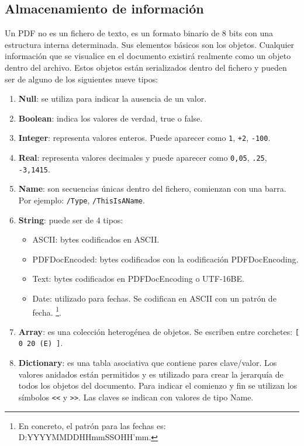 
\subsection{Almacenamiento de información}

Un PDF no es un fichero de texto, es un formato binario de 8 bits con una estructura interna determinada. Sus elementos básicos son los objetos. Cualquier información que se visualice en el documento existirá realmente como un objeto dentro del archivo. Estos objetos están serializados dentro del fichero y pueden ser de alguno de los siguientes nueve tipos:

\begin{enumerate}
    \item \textbf{Null}: se utiliza para indicar la ausencia de un valor.
    \item \textbf{Boolean}: indica los valores de verdad, true o false.
    \item \textbf{Integer}: representa valores enteros. Puede aparecer como \verb|1|, \verb|+2|, \verb|-100|.
    \item \textbf{Real}: representa valores decimales y puede aparecer como \verb|0,05|, \verb|.25|, \verb|-3,1415|.
    \item \textbf{Name}: son secuencias únicas dentro del fichero, comienzan con una barra. Por ejemplo: \verb|/Type|, \verb|/ThisIsAName|.
    \item \textbf{String}: puede ser de 4 tipos:
    \begin{itemize}
        \item ASCII: bytes codificados en ASCII.
        \item PDFDocEncoded: bytes codificados con la codificación PDFDocEncoding.
        \item Text: bytes codificados en PDFDocEncoding o UTF-16BE.
        \item Date: utilizado para fechas. Se codifican en ASCII con un patrón de fecha. \footnote{En concreto, el patrón para las fechas es: D:YYYYMMDDHHmmSSOHH’mm.}.
    \end{itemize}
    \item \textbf{Array}: es una colección heterogénea de objetos. Se escriben entre corchetes: \verb|[ 0 20 (E) ]|.
    \item \textbf{Dictionary}: es una tabla asociativa que contiene pares clave/valor. Los valores anidados están permitidos y es utilizado para crear la jerarquía de todos los objetos del documento. Para indicar el comienzo y fin se utilizan los símbolos \verb|<<| y \verb|>>|. Las claves se indican con valores de tipo Name.

\end{enumerate}
